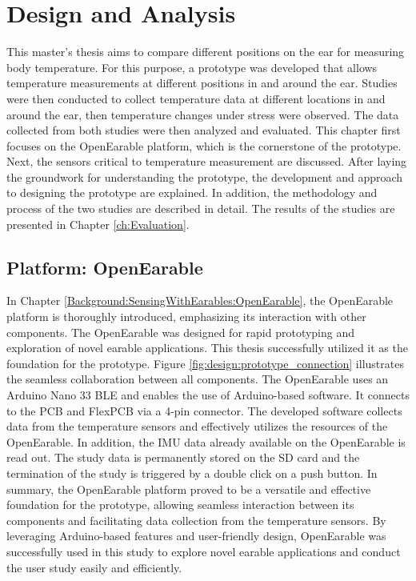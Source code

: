 \chapter{Design and Analysis}
\label{ch:Design}
This master's thesis aims to compare different positions on the ear for measuring body temperature. 
For this purpose, a prototype was developed that allows temperature measurements at different positions in and around the ear. 
Studies were then conducted to collect temperature data at different locations in and around the ear, then temperature changes under stress were observed.
The data collected from both studies were then analyzed and evaluated.
This chapter first focuses on the OpenEarable platform, which is the cornerstone of the prototype. 
Next, the sensors critical to temperature measurement are discussed.
After laying the groundwork for understanding the prototype, the development and approach to designing the prototype are explained.
In addition, the methodology and process of the two studies are described in detail.
The results of the studies are presented in Chapter \ref{ch:Evaluation}.

\section{Platform: OpenEarable}
\label{ch:Design:Prototype:OpenEarable}
In Chapter \ref{Background:SensingWithEarables:OpenEarable}, the OpenEarable platform is thoroughly introduced, emphasizing its interaction with other components. 
The OpenEarable was designed for rapid prototyping and exploration of novel earable applications.
This thesis successfully utilized it as the foundation for the prototype. 
Figure \ref{fig:design:prototype_connection} illustrates the seamless collaboration between all components. 
The OpenEarable uses an Arduino Nano 33 BLE and enables the use of Arduino-based software. It connects to the PCB and FlexPCB via a 4-pin connector. 
The developed software collects data from the temperature sensors and effectively utilizes the resources of the OpenEarable. 
In addition, the IMU data already available on the OpenEarable is read out.
The study data is permanently stored on the SD card and the termination of the study is triggered by a double click on a push button.
In summary, the OpenEarable platform proved to be a versatile and effective foundation for the prototype, allowing seamless interaction between its components and facilitating data collection from the temperature sensors. 
By leveraging Arduino-based features and user-friendly design, OpenEarable was successfully used in this study to explore novel earable applications and conduct the user study easily and efficiently.

